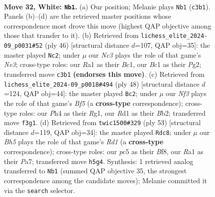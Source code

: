 \documentclass[11pt]{article}
\begin{document}
\clearpage

\begin{figure}[p]\centering
\begin{subfigure}{0.46\textwidth}\centering
\resizebox{\linewidth}{!}{%
\newchessgame
\chessboard[
  setfen={r1bq2k1/3pr1bp/p3p3/2p2p1B/P1nP1Q1P/2N2N2/1P3PK1/R1BR4 w - - 0 32},
  showmover=false,
  pgfstyle=straightmove, color=movearrow, markmove={c3-b1}
]}
\caption{}
\end{subfigure}\hfill
\begin{subfigure}{0.46\textwidth}\centering
\resizebox{\linewidth}{!}{%
\newchessgame
\chessboard[
  setfen={2b1rbk1/5pp1/q2p1n1p/1p1Pp3/8/1BPQN2P/1P3PP1/2BR2K1 w - - 7 24},
  showmover=false,
  pgfstyle=straightmove, color=movearrow, markmove={e3-c2}
]}
\caption{}
\end{subfigure}
\\[4pt]
\begin{subfigure}{0.46\textwidth}\centering
\resizebox{\linewidth}{!}{%
\newchessgame
\chessboard[
  setfen={3qrb1k/2r2pp1/p4n1p/1p1b1B2/2pN4/P1Q1PP2/1B1P2RP/2K3R1 w - - 0 25},
  showmover=false,
  pgfstyle=straightmove, color=movearrow, markmove={f5-c2}
]}
\caption{}
\end{subfigure}\hfill
\begin{subfigure}{0.46\textwidth}\centering
\resizebox{\linewidth}{!}{%
\newchessgame
\chessboard[
  setfen={3r1bk1/pbr2pp1/4qn1p/2ppN3/5P2/1P2PP2/PB1R2BP/3Q2RK b - - 0 27},
  showmover=false,
  pgfstyle=straightmove, color=movearrow, markmove={d8-c8}
]}
\caption{}
\end{subfigure}
\caption{\textbf{Move 32, White: \texttt{Nb1}.} (a) Our position; Melanie plays \texttt{Nb1} (\texttt{c3b1}). Panels (b)--(d) are the retrieved master positions whose correspondence most drove this move (highest QAP objective among those that transfer to it). (b) Retrieved from \texttt{lichess\_elite\_2024-09\_p0031\#52} (ply 46) [structural distance $d$=107, QAP obj=35]: the master played \texttt{Nc2}; under $\mu$ our \emph{Nc3} plays the role of that game's \emph{Ne3}; cross-type roles: our \emph{R}a1 as their \emph{B}c1, our \emph{B}c1 as their \emph{P}g2; transferred move \texttt{c3b1} \textbf{(endorses this move)}. (c) Retrieved from \texttt{lichess\_elite\_2024-09\_p0018\#494} (ply 48) [structural distance $d$=124, QAP obj=44]: the master played \texttt{Bc2}; under $\mu$ our \emph{Nf3} plays the role of that game's \emph{Bf5} (a \textbf{cross-type} correspondence); cross-type roles: our \emph{P}h4 as their \emph{R}g1, our \emph{R}d1 as their \emph{B}b2; transferred move \texttt{f3g1}. (d) Retrieved from \texttt{twic1500\#329} (ply 53) [structural distance $d$=119, QAP obj=34]: the master played \texttt{Rdc8}; under $\mu$ our \emph{Bh5} plays the role of that game's \emph{Rd1} (a \textbf{cross-type} correspondence); cross-type roles: our \emph{p}c5 as their \emph{B}f8, our \emph{R}a1 as their \emph{P}a7; transferred move \texttt{h5g4}. Synthesis: 1 retrieved analog transferred to \texttt{Nb1} (summed QAP objective 35, the strongest correspondence among the candidate moves); Melanie committed it via the \texttt{search} selector.}
\label{fig:thought-m62}
\end{figure}
\end{document}
